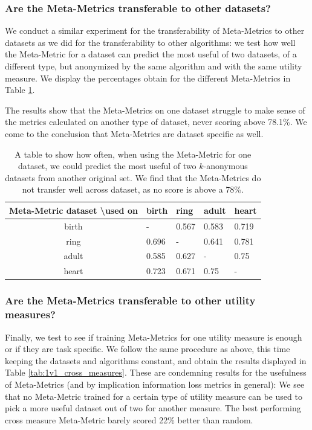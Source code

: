\subsubsection{Are the Meta-Metrics transferable to other datasets?}
We conduct a similar experiment for the transferability of Meta-Metrics to other datasets as we did for the transferability to other algorithms: we test how well the Meta-Metric for a dataset can predict the most useful of two datasets, of a different type, but anonymized by the same algorithm and with the same utility measure. We display the percentages obtain for the different Meta-Metrics in Table \ref{tab:1v1_cross_sets}.

The results show that the Meta-Metrics on one dataset struggle to make sense of the metrics calculated on another type of dataset, never scoring above 78.1\%. We come to the conclusion that Meta-Metrics are dataset specific as well.
\begin{table}[h]
    \center
    \begin{tabular}{|c|l|l|l|l|}
\hline
\rowcolor{gray!50}
Meta-Metric dataset \textbackslash used on & birth & ring  & adult & heart \\
\hline
\cellcolor{gray!50} birth   & -     & 0.567 & 0.583 & 0.719 \\
\cellcolor{gray!50} ring    & 0.696 & -     & 0.641 & 0.781 \\
\cellcolor{gray!50} adult   & 0.585 & 0.627 & -     & 0.75  \\
\cellcolor{gray!50} heart   & 0.723 & 0.671 & 0.75  & - \\
\hline
\end{tabular}
    \caption{A table to show how often, when using the Meta-Metric for one dataset, we could predict the most useful of two $k$-anonymous datasets from another original set. We find that the Meta-Metrics do not transfer well across dataset, as no score is above a 78\%.}
    \label{tab:1v1_cross_sets}
\end{table}

\subsubsection{Are the Meta-Metrics transferable to other utility measures?}
Finally, we test to see if training Meta-Metrics for one utility measure is enough or if they are task specific. We follow the same procedure as above, this time keeping the datasets and algorithms constant, and obtain the results displayed in Table \ref{tab:1v1_cross_measures}. These are condemning results for the usefulness of Meta-Metrics (and by implication information loss metrics in general): We see that no Meta-Metric trained for a certain type of utility measure can be used to pick a more useful dataset out of two for another measure. The best performing cross measure Meta-Metric barely scored 22\% better than random.

